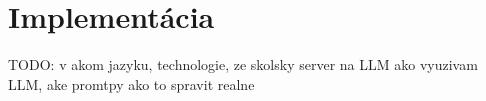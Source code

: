 \chapter{Implementácia}

TODO: v akom jazyku, technologie, ze skolsky server na LLM
 ako vyuzivam LLM, ake promtpy
ako to spravit realne
